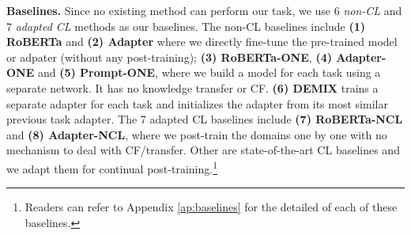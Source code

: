 \documentclass[11pt]{article}
\begin{document}
\vspace{+1.5mm}
\noindent
\textbf{Baselines.} Since no existing method can perform our task, we use 6 \textit{non-CL} and 7 \textit{adapted CL} methods as our baselines. The non-CL baselines include \textbf{(1) RoBERTa} and \textbf{(2) Adapter} where we directly fine-tune the pre-trained model or adpater (without any post-training); \textbf{(3) RoBERTa-ONE}, \textbf{(4) Adapter-ONE} and \textbf{(5) Prompt-ONE}, where we build a model for each task using a separate network. It has no knowledge transfer or CF. \textbf{(6) DEMIX} \cite{gururangan2021demix} trains a separate adapter for each task and initializes the adapter from its most similar previous task adapter. The 7 adapted CL baselines include \textbf{(7) RoBERTa-NCL} and \textbf{(8) Adapter-NCL}, where we post-train the domains one by one with no mechanism to deal with CF/transfer. Other are state-of-the-art CL baselines and we adapt them for continual post-training.\footnote{Readers can refer to Appendix \ref{ap:baselines} for the detailed of each of these baselines.}
\end{document}
